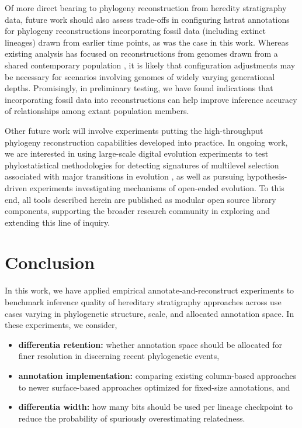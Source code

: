 Of more direct bearing to phylogeny reconstruction from heredity stratigraphy data, future work should also assess trade-offs in configuring hstrat annotations for phylogeny reconstructions incorporating fossil data (including extinct lineages) drawn from earlier time points, as was the case in this work.
Whereas existing analysis has focused on reconstructions from genomes drawn from a shared contemporary population \citep{moreno2025testing}, it is likely that configuration adjustments may be necessary for scenarios involving genomes of widely varying generational depths.
Promisingly, in preliminary testing, we have found indications that incorporating fossil data into reconstructions can help improve inference accuracy of relationships among extant population members.

Other future work will involve experiments putting the high-throughput phylogeny reconstruction capabilities developed into practice.
In ongoing work, we are interested in using large-scale digital evolution experiments to test phylostatistical methodologies for detecting signatures of multilevel selection associated with major transitions in evolution \citep{BonettiFranceschi2024}, as well as pursuing hypothesis-driven experiments investigating mechanisms of open-ended evolution.
To this end, all tools described herein are published as modular open source library components, supporting the broader research community in exploring and extending this line of inquiry.

\section{Conclusion} \label{sec:conclusion}

In this work, we have applied empirical annotate-and-reconstruct experiments to benchmark inference quality of hereditary stratigraphy approaches across use cases varying in phylogenetic structure, scale, and allocated annotation space.
In these experiments, we consider,
\begin{itemize}
\item \textbf{differentia retention:} whether annotation space should be allocated for finer resolution in discerning recent phylogenetic events,
\item \textbf{annotation implementation:} comparing existing column-based approaches to newer surface-based approaches optimized for fixed-size annotations, and
\item \textbf{differentia width:} how many bits should be used per lineage checkpoint to reduce the probability of spuriously overestimating relatedness.
\end{itemize}

